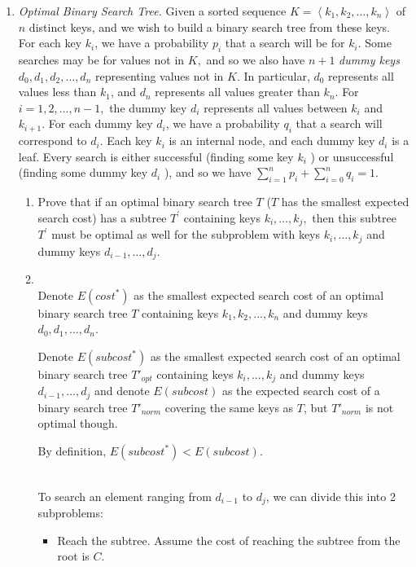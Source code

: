 \documentclass[12pt,a4paper]{article}
\makeatletter
\newtheorem*{solution}{Solution}
\theoremstyle{definition}
\renewenvironment{solution}[1][Solution] {\par\pushQED{\qed}\normalfont\topsep6\p@\@plus6\p@\relax\trivlist\item[\hskip\labelsep\bfseries#1\@addpunct{.}]\ignorespaces}{\popQED\endtrivlist\@endpefalse} \makeatother
\makeatother
\begin{document}
	\begin{enumerate}
		\item \textit{Optimal Binary Search Tree.} Given a sorted sequence $K=\left \langle k_{1}, k_{2}, \ldots, k_{n} \right \rangle$ of $n$ distinct keys, and we wish to build a binary search tree from these keys. For each key $k_{i}$, we have a probability $p_{i}$ that a search will be for $k_{i}$. Some searches may be for values not in $K,$ and so we also have $n+1$ \emph{dummy keys} $d_{0}, d_{1}, d_{2}, \ldots, d_{n}$ representing values not in $K$. In particular, $d_{0}$ represents all values less than $k_{1}$, and $d_{n}$ represents all values greater than $k_{n}$. For $i=1,2, \ldots, n-1,$ the dummy key $d_{i}$ represents all values between $k_{i}$ and $k_{i+1}$. For each dummy key $d_{i}$, we have a probability $q_{i}$ that a search will correspond to $d_{i}$. Each key $k_{i}$ is an internal node, and each dummy key $d_{i}$ is a leaf. Every search is either successful (finding some key $k_{i}$ ) or unsuccessful (finding some dummy key $d_{i}$ ), and so we have $ \sum_{i=1}^{n} p_{i}+\sum_{i=0}^{n} q_{i}=1 $. 
		\begin{enumerate}
			\item Prove that if an optimal binary search tree $T$ ($ T $ has the smallest expected search cost) has a subtree $T^{\prime}$ containing keys $k_{i}, \ldots, k_{j},$ then this subtree $T^{\prime}$ must be optimal as well for the subproblem with keys $k_{i}, \ldots, k_{j}$ and dummy keys $d_{i-1}, \ldots, d_{j}$. 
			
			\begin{solution}
			~\\
			Denote $E(cost^*)$ as the smallest expected search cost of an optimal binary search tree $T$ containing keys $k_1,k_2,...,k_n$ and dummy keys $d_0, d_1, ..., d_n$.
			
			Denote $E(subcost^*)$ as the smallest expected search cost of an optimal binary search tree $T'_{opt}$ containing keys $k_i,...,k_j$ and dummy keys $d_{i-1},...,d_j$ and denote $E(subcost)$ as the expected search cost of a binary search tree $T'_{norm}$ covering the same keys as $T$, but $T'_{norm}$ is not optimal though. 
			
			By definition, $E(subcost^*)<E(subcost)$.
			
			~\\
			To search an element ranging from $d_{i-1}$ to $d_j$, we can divide this into 2 subproblems:
			
			\begin{itemize}
			    \item Reach the subtree. Assume the cost of reaching the subtree from the root is $C$.
			    

\end{itemize}
\end{solution}
\end{enumerate}
\end{enumerate}
\end{document}
